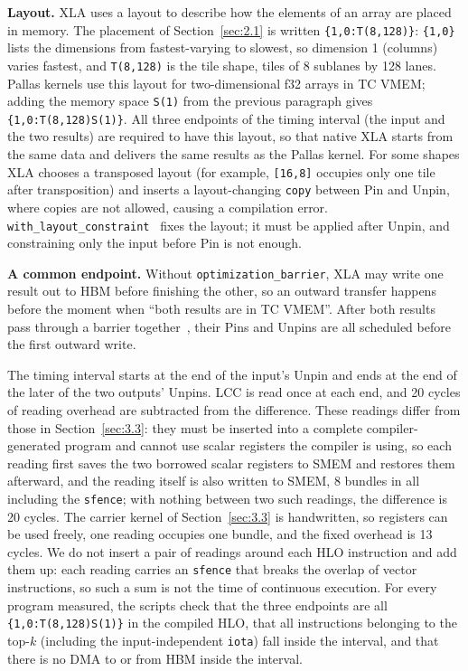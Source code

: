 \documentclass[sigconf,nonacm,balance=false]{acmart}
\newcommand{\code}[1]{\texttt{#1}}
\begin{document}
\textbf{Layout.} XLA uses a layout to describe how the elements of an array are placed in memory. The placement of Section~\ref{sec:2.1} is written \code{\{1,\allowbreak{}0:T(\allowbreak{}8,\allowbreak{}128)\}}: \code{\{1,\allowbreak{}0\}} lists the dimensions from fastest-varying to slowest, so dimension 1 (columns) varies fastest, and \code{T(\allowbreak{}8,\allowbreak{}128)} is the tile shape, tiles of 8 sublanes by 128 lanes. Pallas kernels use this layout for two-dimensional f32 arrays in TC VMEM; adding the memory space \code{S(\allowbreak{}1)} from the previous paragraph gives \code{\{1,\allowbreak{}0:T(\allowbreak{}8,\allowbreak{}128)S(\allowbreak{}1)\}}. All three endpoints of the timing interval (the input and the two results) are required to have this layout, so that native XLA starts from the same data and delivers the same results as the Pallas kernel. For some shapes XLA chooses a transposed layout (for example, \code{[16,\allowbreak{}8]} occupies only one tile after transposition) and inserts a layout-changing \code{copy} between Pin and Unpin, where copies are not allowed, causing a compilation error. \code{with\_\allowbreak{}layout\_\allowbreak{}constraint}~\cite{jax-layout} fixes the layout; it must be applied after Unpin, and constraining only the input before Pin is not enough.

\textbf{A common endpoint.} Without \code{optimization\_\allowbreak{}barrier}, XLA may write one result out to HBM before finishing the other, so an outward transfer happens before the moment when ``both results are in TC VMEM''. After both results pass through a barrier together~\cite{pallas-async}, their Pins and Unpins are all scheduled before the first outward write.

The timing interval starts at the end of the input's Unpin and ends at the end of the later of the two outputs' Unpins. LCC is read once at each end, and 20 cycles of reading overhead are subtracted from the difference. These readings differ from those in Section~\ref{sec:3.3}: they must be inserted into a complete compiler-generated program and cannot use scalar registers the compiler is using, so each reading first saves the two borrowed scalar registers to SMEM and restores them afterward, and the reading itself is also written to SMEM, 8 bundles in all including the \code{sfence}; with nothing between two such readings, the difference is 20 cycles. The carrier kernel of Section~\ref{sec:3.3} is handwritten, so registers can be used freely, one reading occupies one bundle, and the fixed overhead is 13 cycles. We do not insert a pair of readings around each HLO instruction and add them up: each reading carries an \code{sfence} that breaks the overlap of vector instructions, so such a sum is not the time of continuous execution. For every program measured, the scripts check that the three endpoints are all \code{\{1,\allowbreak{}0:T(\allowbreak{}8,\allowbreak{}128)S(\allowbreak{}1)\}} in the compiled HLO, that all instructions belonging to the top-$k$ (including the input-independent \code{iota}) fall inside the interval, and that there is no DMA to or from HBM inside the interval.
\end{document}
